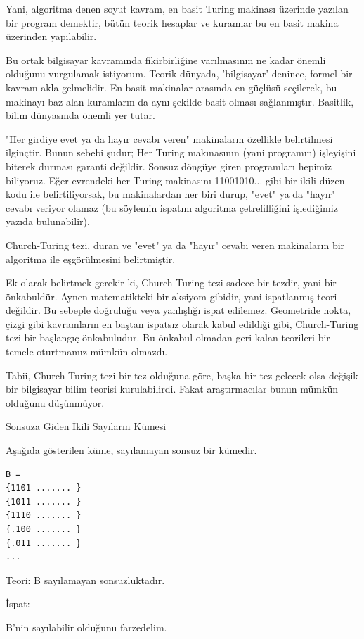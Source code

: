 \documentclass[12pt,fleqn]{article}\usepackage{../../common}
\begin{document}
Yani, algoritma denen soyut kavram, en basit Turing makinası üzerinde yazılan
bir program demektir, bütün teorik hesaplar ve kuramlar bu en basit makina
üzerinden yapılabilir.

Bu ortak bilgisayar kavramında fikirbirliğine varılmasının ne kadar önemli
olduğunu vurgulamak istiyorum. Teorik dünyada, 'bilgisayar' denince, formel bir
kavram akla gelmelidir. En basit makinalar arasında en güçlüsü seçilerek, bu
makinayı baz alan kuramların da aynı şekilde basit olması
sağlanmıştır. Basitlik, bilim dünyasında önemli yer tutar.

"Her girdiye evet ya da hayır cevabı veren" makinaların özellikle belirtilmesi
ilginçtir. Bunun sebebi şudur; Her Turing makınasının (yani programın)
işleyişini biterek durması garanti değildir. Sonsuz döngüye giren programları
hepimiz biliyoruz. Eğer evrendeki her Turing makinasını 11001010... gibi bir
ikili düzen kodu ile belirtiliyorsak, bu makinalardan her biri durup, "evet" ya
da "hayır" cevabı veriyor olamaz (bu söylemin ispatını algoritma çetrefilliğini
işlediğimiz yazıda bulunabilir).

Church-Turing tezi, duran ve "evet" ya da "hayır" cevabı veren makinaların bir
algoritma ile eşgörülmesini belirtmiştir.

Ek olarak belirtmek gerekir ki, Church-Turing tezi sadece bir tezdir, yani bir
önkabuldür. Aynen matematikteki bir aksiyom gibidir, yani ispatlanmış teori
değildir. Bu sebeple doğruluğu veya yanlışlığı ispat edilemez. Geometride nokta,
çizgi gibi kavramların en baştan ispatsız olarak kabul edildiği gibi,
Church-Turing tezi bir başlangıç önkabuludur. Bu önkabul olmadan geri kalan
teorileri bir temele oturtmamız mümkün olmazdı.

Tabii, Church-Turing tezi bir tez olduğuna göre, başka bir tez gelecek olsa
değişik bir bilgisayar bilim teorisi kurulabilirdi. Fakat araştırmacılar bunun
mümkün olduğunu düşünmüyor.

Sonsuza Giden İkili Sayıların Kümesi

Aşağıda gösterilen küme, sayılamayan sonsuz bir kümedir.

\begin{verbatim}
B =
{1101 ....... }
{1011 ....... }
{1110 ....... }
{.100 ....... }
{.011 ....... }
...
\end{verbatim}

Teori: B sayılamayan sonsuzluktadır.

İspat:

B'nin sayılabilir olduğunu farzedelim.
\end{document}
